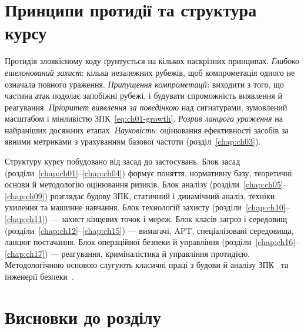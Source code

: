\section{Принципи протидії та структура курсу}\label{sec:ch01-structure}

Протидія злоякісному коду ґрунтується на кількох наскрізних принципах. \emph{Глибоко ешелонований захист}: кілька незалежних рубежів, щоб компрометація одного не означала повного ураження. \emph{Припущення компрометації}: виходити з того, що частина атак подолає запобіжні рубежі, і будувати спроможність виявлення й реагування. \emph{Пріоритет виявлення за поведінкою} над сигнатурами, зумовлений масштабом і мінливістю ЗПК~\eqref{eq:ch01-growth}. \emph{Розрив ланцюга ураження} на найраніших досяжних етапах. \emph{Науковість}: оцінювання ефективності засобів за явними метриками з урахуванням базової частоти (розділ~\ref{chap:ch03}).

Структуру курсу побудовано від засад до застосувань. Блок засад (розділи~\ref{chap:ch01}--\ref{chap:ch04}) формує поняття, нормативну базу, теоретичні основи й методологію оцінювання ризиків. Блок аналізу (розділи~\ref{chap:ch05}--\ref{chap:ch09}) розглядає будову ЗПК, статичний і динамічний аналіз, техніки ухилення та машинне навчання. Блок технологій захисту (розділи~\ref{chap:ch10}--\ref{chap:ch11}) --- захист кінцевих точок і мереж. Блок класів загроз і середовищ (розділи~\ref{chap:ch12}--\ref{chap:ch15}) --- вимагачі, APT, спеціалізовані середовища, ланцюг постачання. Блок операційної безпеки й управління (розділи~\ref{chap:ch16}--\ref{chap:ch17}) --- реагування, криміналістика й управління протидією. Методологічною основою слугують класичні праці з будови й аналізу ЗПК~\cite{szor,aycock,sikorski} та інженерії безпеки~\cite{anderson}.

\section*{Висновки до розділу}

